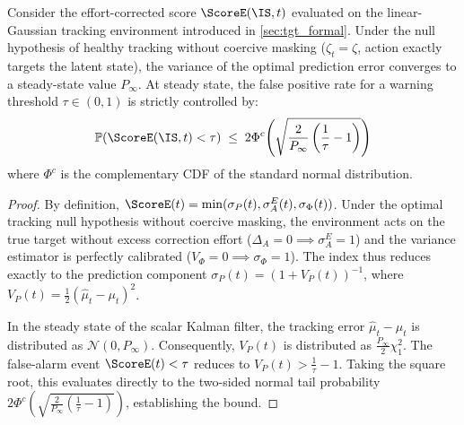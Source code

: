 \begin{proposition}\label{prop:gaussian_false_alarm}
Consider the effort-corrected score $\ScoreE(\IS, t)$ evaluated on the
linear-Gaussian tracking environment introduced in \cref{sec:tgt_formal}. Under
the null hypothesis of healthy tracking without coercive masking ($\zeta_t = \zeta$,
action exactly targets the latent state), the variance of the optimal prediction
error converges to a steady-state value $P_\infty$. At steady state, the false
positive rate for a warning threshold $\tau \in (0, 1)$ is strictly controlled by:
\[
  \mathbb{P}(\ScoreE(\IS, t) < \tau) \;\le\; 2 \Phi^c\!\left( \sqrt{\frac{2}{P_\infty}\left(\frac{1}{\tau} - 1\right)} \right)
\]
where $\Phi^c$ is the complementary CDF of the standard normal distribution.
\end{proposition}

\begin{proof}
By definition, $\ScoreE(t) = \min(\sigma_P(t), \sigma_A^E(t), \sigma_\Phi(t))$.
Under the optimal tracking null hypothesis without coercive masking, the
environment acts on the true target without excess correction effort
($\Delta_A = 0 \implies \sigma_A^E = 1$) and the variance estimator is perfectly
calibrated ($V_\Phi = 0 \implies \sigma_\Phi = 1$). The index thus reduces
exactly to the prediction component $\sigma_P(t) = (1 + V_P(t))^{-1}$, where
$V_P(t) = \frac{1}{2}(\hat{\mu}_t - \mu_t)^2$.

In the steady state of the scalar Kalman filter, the tracking error
$\hat{\mu}_t - \mu_t$ is distributed as $\mathcal{N}(0, P_\infty)$. Consequently,
$V_P(t)$ is distributed as $\frac{P_\infty}{2} \chi^2_1$. The false-alarm event
$\ScoreE(t) < \tau$ reduces to $V_P(t) > \frac{1}{\tau} - 1$. Taking the square
root, this evaluates directly to the two-sided normal tail probability
$2 \Phi^c\!\left(\sqrt{\frac{2}{P_\infty}(\frac{1}{\tau} - 1)}\right)$,
establishing the bound.
\end{proof}
